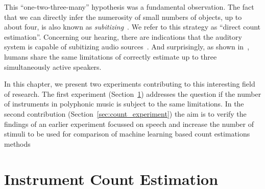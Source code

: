This ``one-two-three-many'' hypothesis was a fundamental observation.
The fact that we can directly infer the numerosity of small numbers of objects, up to about four, is also known as \emph{subitizing}~\cite{kaufman49, burr10}. We refer to this strategy as ``direct count estimation''.
Concerning our hearing, there are indications that the auditory system is capable of subitizing audio sources~\cite{hoopen79}.
And surprisingly, as shown in~\cite{kashino96, kawashima15}, humans share the same limitations of correctly estimate up to three simultaneously active speakers.
\par
In this chapter, we present two experiments contributing to this interesting field of research.
The first experiment (Section~\ref{sec:ismir}) addresses the question if the number of instruments in polyphonic music is subject to the same limitations.
In the second contribution (Section~\ref{sec:count_experiment}) the aim is to verify the findings of an earlier experiment focussed on speech and increase the number of stimuli to be used for comparison of machine learning based count estimations methods

\section{Instrument Count Estimation}%
\label{sec:ismir}


